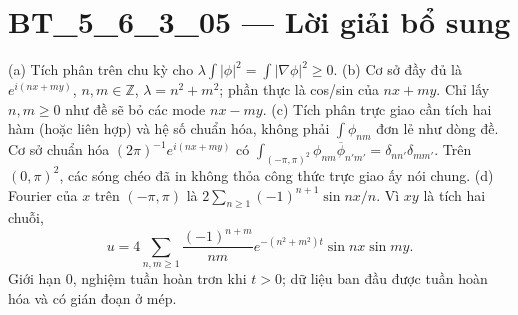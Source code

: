 \documentclass[10pt,a4paper]{article}
\begin{document}
\section*{BT\_5\_6\_3\_05 — Lời giải bổ sung}
(a) Tích phân trên chu kỳ cho $\lambda\int|\phi|^2=\int|\nabla\phi|^2\ge0$.
(b) Cơ sở đầy đủ là $e^{i(nx+my)}$, $n,m\in\mathbb Z$, $\lambda=n^2+m^2$; phần thực là cos/sin của $nx+my$. Chỉ lấy $n,m\ge0$ như đề sẽ bỏ các mode $nx-my$.
(c) Tích phân trực giao cần tích hai hàm (hoặc liên hợp) và hệ số chuẩn hóa, không phải $\int\phi_{nm}$ đơn lẻ như dòng đề. Cơ sở chuẩn hóa $(2\pi)^{-1}e^{i(nx+my)}$ có $\int_{(-\pi,\pi)^2}\phi_{nm}\overline\phi_{n'm'}=\delta_{nn'}\delta_{mm'}$. Trên $(0,\pi)^2$, các sóng chéo đã in không thỏa công thức trực giao ấy nói chung.
(d) Fourier của $x$ trên $(-\pi,\pi)$ là $2\sum_{n\ge1}(-1)^{n+1}\sin nx/n$. Vì $xy$ là tích hai chuỗi,
\[u=4\sum_{n,m\ge1}\frac{(-1)^{n+m}}{nm}e^{-(n^2+m^2)t}\sin nx\sin my.\]
Giới hạn 0, nghiệm tuần hoàn trơn khi $t>0$; dữ liệu ban đầu được tuần hoàn hóa và có gián đoạn ở mép.
\end{document}
